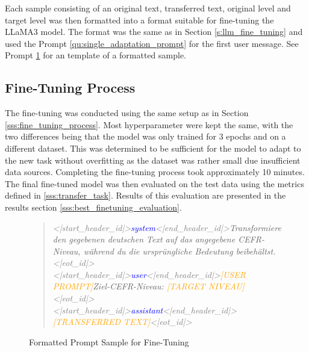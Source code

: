 
Each sample consisting of an original text, transferred text, original level and target level was then formatted into a format suitable for fine-tuning the LLaMA3 model. The format was the same as in Section \ref{s:llm_fine_tuning} and used the Prompt \ref{qu:single_adaptation_prompt} for the first user message. See Prompt \ref{qu:formatted_adaptation_sample} for an template of a formatted sample.

\subsection{Fine-Tuning Process}
\label{ss:fine_tuning_process}
The fine-tuning was conducted using the same setup as in Section \ref{sss:fine_tuning_process}. Most hyperparameter were kept the same, with the two differences being that the model was only trained for 3 epochs and on a different dataset. This was determined to be sufficient for the model to adapt to the new task without overfitting as the dataset was rather small due insufficient data sources. Completing the fine-tuning process took approximately 10 minutes. The final fine-tuned model was then evaluated on the test data using the metrics defined in \ref{sss:transfer_task}. Results of this evaluation are presented in the results section \ref{sss:best_finetuning_evaluation}.

\captionsetup{labelformat=prompt}
\begin{figure}[h]
    \begin{quotation}
        \textit{
            \textcolor{gray}{<|start\_header\_id|>}\textcolor{blue}{system}\textcolor{gray}{<|end\_header\_id|>}Transformiere den gegebenen deutschen Text auf das angegebene CEFR-Niveau, während du die ursprüngliche Bedeutung beibehältst.\textcolor{gray}{<|eot\_id|>} \\
            \textcolor{gray}{<|start\_header\_id|>}\textcolor{blue}{user}\textcolor{gray}{<|end\_header\_id|>}\textcolor{orange}{[USER PROMPT]}Ziel-CEFR-Niveau: \textcolor{orange}{[TARGET NIVEAU]}\textcolor{gray}{<|eot\_id|>} \\
            \textcolor{gray}{<|start\_header\_id|>}\textcolor{blue}{assistant}\textcolor{gray}{<|end\_header\_id|>}\textcolor{orange}{[TRANSFERRED TEXT]}\textcolor{gray}{<|eot\_id|>}
            }
        \end{quotation}
        \caption{Formatted Prompt Sample for Fine-Tuning}
        \label{qu:formatted_adaptation_sample}
\end{figure}
\captionsetup{labelformat=default}


